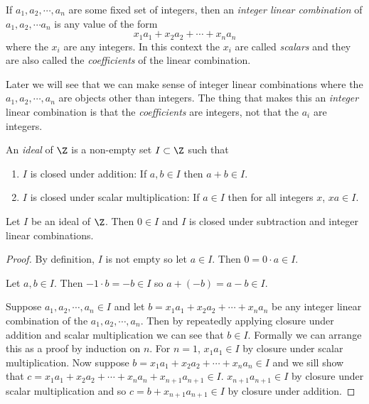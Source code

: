 \documentclass[oneside,12pt]{amsart}
\begin{document}
\begin{definition}
If $a_1,a_2,\cdots, a_n$ are some fixed set of integers,
then an \emph{integer linear combination}
of $a_1,a_2,\cdots a_n$ is any value of the form
$$x_1 a_1 + x_2 a_2 + \cdots + x_n a_n $$
where the $x_i$ are any integers. In this context the $x_i$ are called
\emph{scalars} and they are also called the \emph{coefficients} of the
linear combination.
\end{definition}

Later we will see that we can make sense of integer linear combinations
where the $a_1,a_2,\cdots, a_n$ are objects other than integers. The thing that
makes this an \emph{integer} linear combination is that the \emph{coefficients}
are integers, not that the $a_i$ are integers.

\begin{definition}
An \emph{ideal} of $\Z$ is a non-empty set $I\subset\Z$ such that
\begin{enumerate}
\item $I$ is closed under addition: If $a,b\in I$ then $a+b\in I$.
\item $I$ is closed under scalar multiplication:
If $a\in I$ then for all integers $x$, $xa\in I$.
\end{enumerate}
\end{definition}

\begin{lemma}
Let $I$ be an ideal of $\Z$. Then $0\in I$ and $I$ is closed under subtraction
and integer linear combinations.
\end{lemma}
\begin{proof}
By definition, $I$ is not empty so let $a\in I$. Then $0=0\cdot a \in I$.

Let $a,b\in I$. Then $-1\cdot b = -b \in I$ so $a + (-b) = a-b\in I$.

Suppose $a_1,a_2,\cdots,a_n\in I$ and let
$b=x_1 a_1 + x_2 a_2 + \cdots + x_n a_n$ be any integer linear combination of
the $a_1,a_2,\cdots,a_n$. Then by repeatedly applying closure under addition
and scalar multiplication we can see that $b\in I$. Formally we can arrange this
 as a proof by induction on $n$. For $n=1$, $x_1 a_1 \in I$ by closure under
 scalar multiplication. Now suppose
 $b= x_1 a_1 + x_2 a_2 + \cdots + x_n a_n \in I$ and
 we sill show that $c = x_1 a_1 + x_2 a_2 + \cdots + x_n a_n + x_{n+1}a_{n+1} \in I$.
 $x_{n+1}a_{n+1} \in I$ by closure under scalar multiplication and so
 $c=b+x_{n+1}a_{n+1} \in I$ by closure under addition.
\end{proof}
\end{document}
